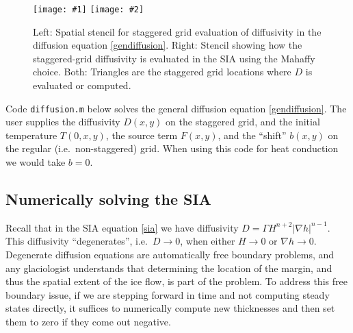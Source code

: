 \documentclass[titlepage,letterpaper,final,12pt]{scrartcl}
\newcommand{\grad}{\nabla}
\newcommand{\minput}[1]{
\bigskip
\begin{quote}
\bigskip
\VerbatimInput[frame=single,framesep=3mm,label=\fbox{\normalsize \textsl{\,#1.m\,}},fontfamily=courier,fontsize=\scriptsize]{../mfiles/#1.slim.m}
\bigskip
\end{quote}
}
\newcommand{\twofigsizes}[5]{
\begin{figure}[ht]
\centering
\texttt{[image: \#1]} \quad
\texttt{[image: \#2]}
\caption{#3}
\label{fig:#1}
\end{figure}}
\newcommand{\twofig}[3]{\twofigsizes{#1}{#2}{#3}{2.5in}{2.5in}}
\begin{document}
\twofig{diffstencil}{mahaffystencil}{Left:  Spatial stencil for staggered grid evaluation of diffusivity in the diffusion equation \eqref{gendiffusion}.  Right: Stencil showing how the staggered-grid diffusivity is evaluated in the SIA using the Mahaffy choice.  Both:  Triangles are the staggered grid locations where $D$ is evaluated or computed.}

Code \texttt{diffusion.m} below solves the general diffusion equation \eqref{gendiffusion}.  The user supplies the diffusivity $D(x,y)$ on the staggered grid, and the initial temperature $T(0,x,y)$, the source term $F(x,y)$, and the ``shift'' $b(x,y)$ on the regular (i.e.~non-staggered) grid.  When using this code for heat conduction we would take $b=0$.

\minput{diffusion}


\subsection{Numerically solving the SIA} \label{sec:numericalsia}

Recall that in the SIA equation \eqref{sia} we have diffusivity $D = \Gamma H^{n+2} |\grad h|^{n-1}$.  This diffusivity ``degenerates'', i.e.~$D \to 0$, when either $H\to 0$ or $\grad h \to 0$.  Degenerate diffusion equations are automatically free boundary problems, and any glaciologist understands that determining the location of the margin, and thus the spatial extent of the ice flow, is part of the problem.
To address this free boundary issue, if we are stepping forward in time and not computing steady states directly, %
it suffices to numerically compute new thicknesses and then set them to zero if they come out negative.
\end{document}
